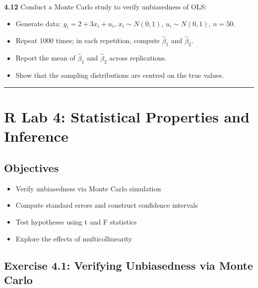 \textbf{4.12} Conduct a Monte Carlo study to verify unbiasedness of OLS:
\begin{itemize}
\item Generate data: $y_i = 2 + 3x_i + u_i$, $x_i \sim N(0,1)$, $u_i \sim N(0,1)$, $n = 50$.
\item Repeat 1000 times; in each repetition, compute $\hat{\beta}_1$ and $\hat{\beta}_2$.
\item Report the mean of $\hat{\beta}_1$ and $\hat{\beta}_2$ across replications.
\item Show that the sampling distributions are centred on the true values.
\end{itemize}

\medskip\hrule\medskip

\section{R Lab 4: Statistical Properties and Inference}

\subsection{Objectives}
\begin{itemize}
\item Verify unbiasedness via Monte Carlo simulation
\item Compute standard errors and construct confidence intervals
\item Test hypotheses using t and F statistics
\item Explore the effects of multicollinearity
\end{itemize}

\subsection{Exercise 4.1: Verifying Unbiasedness via Monte Carlo}

